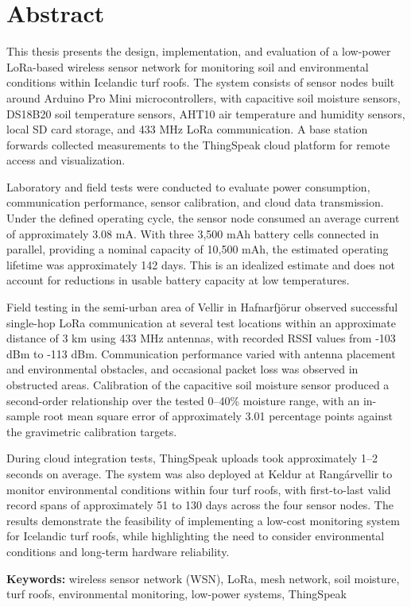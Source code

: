 \chapter*{Abstract}
This thesis presents the design, implementation, and evaluation of a low-power LoRa-based wireless sensor network for monitoring soil and environmental conditions within Icelandic turf roofs. The system consists of sensor nodes built around Arduino Pro Mini microcontrollers, with capacitive soil moisture sensors, DS18B20 soil temperature sensors, AHT10 air temperature and humidity sensors, local SD card storage, and 433 MHz LoRa communication. A base station forwards collected measurements to the ThingSpeak cloud platform for remote access and visualization.

Laboratory and field tests were conducted to evaluate power consumption, communication performance, sensor calibration, and cloud data transmission. Under the defined operating cycle, the sensor node consumed an average current of approximately 3.08 mA. With three 3,500 mAh battery cells connected in parallel, providing a nominal capacity of 10,500 mAh, the estimated operating lifetime was approximately 142 days. This is an idealized estimate and does not account for reductions in usable battery capacity at low temperatures.

Field testing in the semi-urban area of Vellir in Hafnarfj\"{o}r\dh ur observed successful single-hop LoRa communication at several test locations within an approximate distance of 3 km using 433 MHz antennas, with recorded RSSI values from -103 dBm to -113 dBm. Communication performance varied with antenna placement and environmental obstacles, and occasional packet loss was observed in obstructed areas. Calibration of the capacitive soil moisture sensor produced a second-order relationship over the tested 0--40\% moisture range, with an in-sample root mean square error of approximately 3.01 percentage points against the gravimetric calibration targets.

During cloud integration tests, ThingSpeak uploads took approximately 1--2 seconds on average. The system was also deployed at Keldur at Rangárvellir to monitor environmental conditions within four turf roofs, with first-to-last valid record spans of approximately 51 to 130 days across the four sensor nodes. The results demonstrate the feasibility of implementing a low-cost monitoring system for Icelandic turf roofs, while highlighting the need to consider environmental conditions and long-term hardware reliability.

\vfill
\textbf{Keywords:} wireless sensor network (WSN), LoRa, mesh network, soil moisture, turf roofs, environmental monitoring, low-power systems, ThingSpeak


